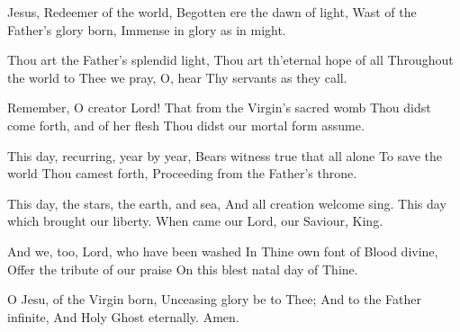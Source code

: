 \documentclass[letterpaper,12pt]{article} %
\begin{document}

\def\greinitialformat#1{%
{\fontsize{34}{34}\selectfont #1}%
}


{\def\annot{\small \textbf{Hymn.}}
\def\annottwo{\small\oldstylenums{\textbf{1.}}}


\large {}}
\vspace{-10pt}
\begin{multicols}{2}
\begin{psalmverses}
{\item Jesus, Redeemer of the world,
Begotten ere the dawn of light,
Wast of the Father's glory born,
Immense in glory as in might.

\item Thou art the Father's splendid light,
Thou art th'eternal hope of all
Throughout the world to Thee we pray,
O, hear Thy servants as they call.

\item Remember, O creator Lord!
That from the Virgin's sacred womb
Thou didst come forth, and of her flesh
Thou didst our mortal form assume.

\item This day, recurring, year by year,
Bears witness true that all alone
To save the world Thou camest forth,
Proceeding from the Father's throne.

\item This day, the stars, the earth, and sea,
And all creation welcome sing.
This day which brought our liberty.
When came our Lord, our Saviour, King.

\item And we, too, Lord, who have been washed
In Thine own font of Blood divine,
Offer the tribute of our praise
On this blest natal day of Thine.

\item O Jesu, of the Virgin born,
Unceasing glory be to Thee;
And to the Father infinite,
And Holy Ghost eternally.  Amen.
}
\end{psalmverses}
\end{multicols}


\end{document}
